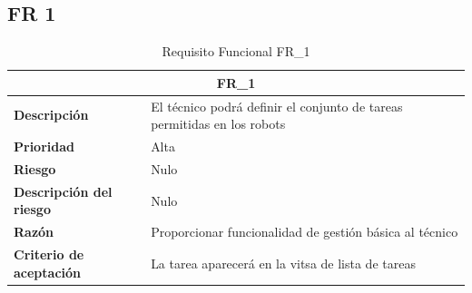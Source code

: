 \documentclass{scrreprt}
\begin{document}
\subsection{FR 1}
\begin{table}[H]
    \label{tab:my-table}
    
    \begin{tabular}{|p{5cm}|p{11cm}|}
    \hline
    \multicolumn{2}{|c|}{\textbf{FR_1}} \\
    \hline
    \textbf{Descripción  }                      & El técnico podrá definir el conjunto de tareas permitidas en los robots                                                                                            \\ \hline
    \textbf{Prioridad}                          & Alta                                                                                              \\ \hline
    \textbf{Riesgo}                          & Nulo                                                                                                \\ \hline
    \textbf{Descripción del riesgo}                    & Nulo                                                                               \\ \hline
    \textbf{Razón}                   & Proporcionar funcionalidad de gestión básica al técnico                                                                                                 \\ \hline
    \textbf{Criterio de aceptación}                    & La tarea aparecerá en la vitsa de lista de tareas \\ \hline

    \end{tabular}%
    
    \caption{Requisito Funcional FR_1}
\end{table}
\end{document}
